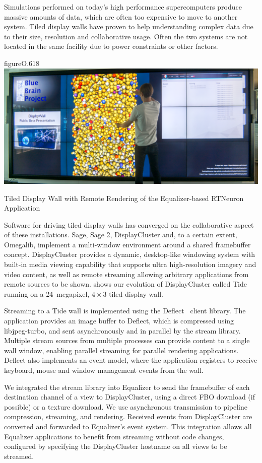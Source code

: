 Simulations performed on today’s high performance supercomputers produce
massive amounts of data, which are often too expensive to move to another
system. Tiled display walls have proven to help understanding complex data due
to their size, resolution and collaborative usage. Often the two systems are
not located in the same facility due to power constraints or other factors.

\begin{wrapfloat}{figure}{O}{.618\textwidth}
  \includegraphics[width=.618\textwidth]{images/tide}
  {\caption{\label{fTide}Tiled Display Wall with Remote Rendering of the Equalizer-based RTNeuron Application}}
\end{wrapfloat}

Software for driving tiled display walls has converged on the collaborative
aspect of these installations. Sage, Sage 2, DisplayCluster and, to a certain
extent, Omegalib, implement a multi-window environment around a shared
framebuffer concept. DisplayCluster provides a dynamic, desktop-like windowing
system with built-in media viewing capability that supports ultra
high-resolution imagery and video content, as well as remote streaming allowing
arbitrary applications from remote sources to be shown.  shows our
evolution of DisplayCluster called Tide~\cite{tide} running on a 24~megapixel,
$4\times 3$ tiled display wall.

Streaming to a Tide wall is implemented using the Deflect~\cite{deflect} client
library. The application provides an image buffer to Deflect, which is
compressed using libjpeg-turbo, and sent asynchronously and in parallel by the
stream library. Multiple stream sources from multiple processes can provide
content to a single wall window, enabling parallel streaming for parallel
rendering applications. Deflect also implements an event model, where the
application registers to receive keyboard, mouse and window management events
from the wall.

We integrated the stream library into Equalizer to send the framebuffer of each
destination channel of a view to DisplayCluster, using a direct FBO download
(if possible) or a texture download. We use asynchronous transmission to
pipeline compression, streaming, and rendering. Received events from
DisplayCluster are converted and forwarded to Equalizer’s event system. This
integration allows all Equalizer applications to benefit from streaming without
code changes, configured by specifying the DisplayCluster hostname on all views
to be streamed.

